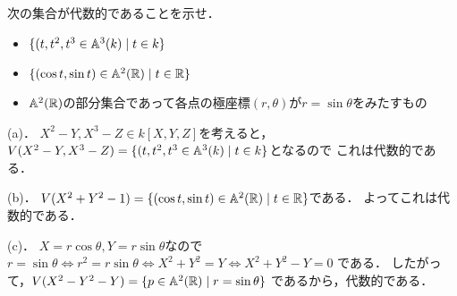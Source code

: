 \begin{prob}
  次の集合が代数的であることを示せ．
  \begin{itemize}
    \item[(a)] $\{ (t,t^2,t^3 \in \mathbb{A}^3(k) \mid t \in k \}$
    \item[(b)] $\{ (\cos t, \sin t) \in \mathbb{A}^2(\mathbb{R}) \mid t \in \mathbb{R} \} $
    \item[(c)] $\mathbb{A}^2(\mathbb{R})$の部分集合であって各点の極座標$(r,\theta)$が$r=\sin \theta$をみたすもの
  \end{itemize}
\end{prob}
\begin{ans}
  (a)．
  $X^2-Y, X^3-Z \in k[X,Y,Z]$を考えると，
  $V(X^2-Y,X^3-Z) = \{ (t,t^2,t^3 \in \mathbb{A}^3(k) \mid t \in k \}$となるので
  これは代数的である．
  
  (b)．
  $V(X^2 + Y^2 - 1) = \{ (\cos t, \sin t) \in \mathbb{A}^2(\mathbb{R}) \mid t \in \mathbb{R} \} $である．
  よってこれは代数的である．

  (c)．
  $X = r \cos \theta, Y = r \sin \theta$なので
  $ r = \sin \theta
  \Leftrightarrow r^2 = r \sin \theta
  \Leftrightarrow X^2 + Y^2 = Y
  \Leftrightarrow X^2 + Y^2 - Y = 0 $
  である．
  したがって，$V(X^2 - Y^2 - Y) = \{ p \in \mathbb{A}^2(\mathbb{R}) \mid r = \sin \theta \} $
  であるから，代数的である．
\end{ans}

